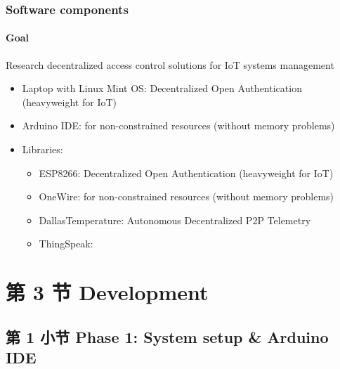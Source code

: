 \documentclass[
    aspectratio=169,                   %
]{beamer}
\begin{document}
    \begin{frame}
        \frametitle{Software components}

        \paragraph{Goal} Research decentralized access control solutions for IoT systems management

        \begin{itemize}
            \item \alert{Laptop with Linux Mint OS}: Decentralized Open Authentication (heavyweight for IoT)
            \item \alert{Arduino IDE}: for non-constrained resources (without memory problems)\cite{ouaddah}
            \item \alert{Libraries:}
            \begin{itemize}
                \item \alert{ESP8266}: Decentralized Open Authentication (heavyweight for IoT)
                \item \alert{OneWire}: for non-constrained resources (without memory problems)
                \item \alert{DallasTemperature}: Autonomous Decentralized P2P Telemetry   
                \item \alert{ThingSpeak}:      
            \end{itemize}
        \end{itemize}

    \end{frame}

\section{第 3 节 Development}

\subsection{第 1 小节 Phase 1: System setup \& Arduino IDE}
\end{document}
